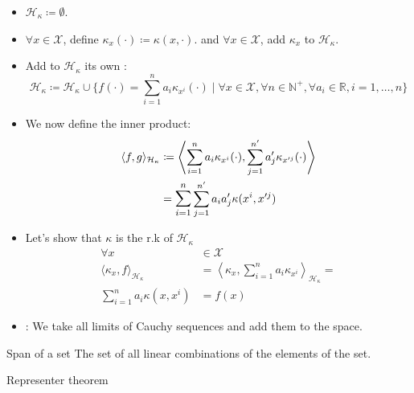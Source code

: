 \begin{itemize}
	\item $\mathcal{H}_\kappa \coloneqq \emptyset$.
	\item $\forall x \in \mathcal{X}$, define $\kappa_x(\cdot) \coloneqq \kappa(x, \cdot)$.
	      and $\forall x \in \mathcal{X}$, add $\kappa_x$ to $\mathcal{H}_\kappa$.
	\item Add to $\mathcal{H}_\kappa$ its own :
	      \begin{equation*}
		      \mathcal{H}_\kappa \coloneqq \mathcal{H}_\kappa \cup \{
		      f(\cdot) = \sum_{i=1}^n a_i \kappa_{x^i}(\cdot) \mid
		      \forall x \in \mathcal{X},
		      \forall n \in \mathds{N}^+,
		      \forall a_i \in \mathds{R},
		      i=1,\dots,n
		      \}
	      \end{equation*}
	\item We now define the inner product:
	      \begin{align*}
          \langle f, g \rangle_{\mathcal{H}_\kappa} &\coloneqq
		      \left\langle
            \sum_{i=1}^n a_i \kappa_{x^i}(\cdot), \sum_{j=1}^{n'} a'_j \kappa_{x'^j}(\cdot)
		      \right\rangle \\
                                                    &= \mathlarger{\sum_{i=1}^n} \sum_{j=1}^{n'} a_i a'_j \kappa({x^i}, {x'^j})
	      \end{align*}
      \item Let's show that $\kappa$ is the r.k of $\mathcal{H}_\kappa$
        \begin{align*}
          \forall x &\in \mathcal{X} \\
          \langle \kappa_x, f \rangle_{\mathcal{H}_\kappa} &=
          \left\langle \kappa_x, \sum_{i=1}^n a_i \kappa_{x^i} \right\rangle_{\mathcal{H}_\kappa} = \\
          \sum_{i=1}^n a_i \kappa(x, x^i) &= f(x)
        \end{align*}
      \item {}: We take all limits of Cauchy sequences
        and add them to the space.
\end{itemize}

\begin{definition}{Span of a set}{}
	The set of all linear combinations of the elements of the set.
\end{definition}

\begin{theorem}{Representer theorem}{}
\end{theorem}
